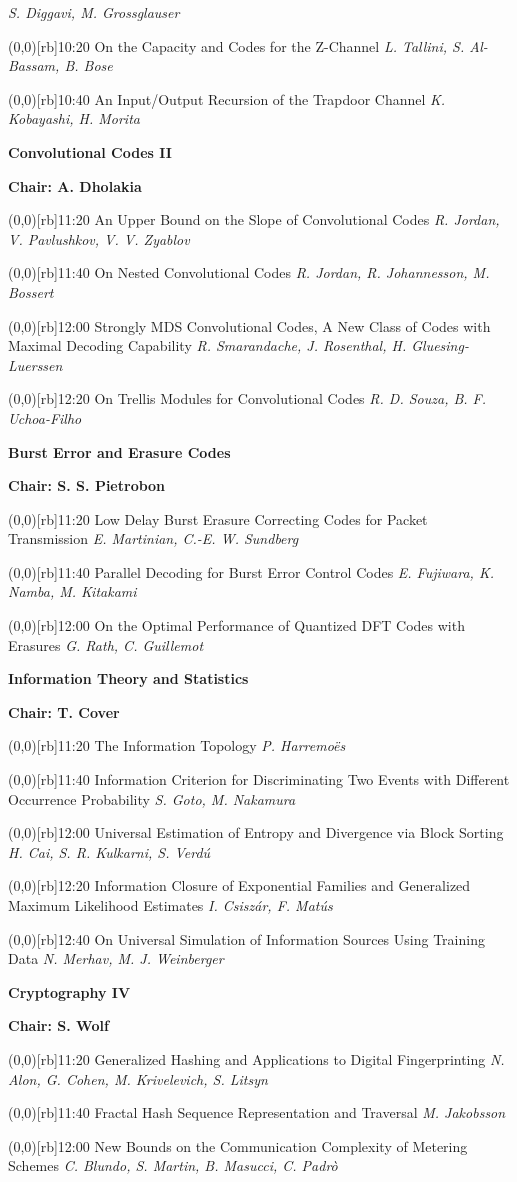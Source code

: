 \documentclass[a5paper,twoside]{article}
\def\period#1{\flushleft{\large\bfseries #1}\markboth{\sf #1}{\sf #1}}
\def\sesstitle#1{\vspace{.45\bigskipamount}\par{\bfseries #1}\par}
\def\sesschair#1{{\bfseries Chair: #1}\par\vspace{.65\medskipamount}}
\def\papertime#1{\makebox(0,0)[rb]{{\scriptsize #1}\hspace{.5em}}}
\def\papertitle#1{#1\hfil\break}
\def\paperauthors#1{{\itshape #1}\par\filbreak\vspace{.65\medskipamount}}
\begin{document}
\paperauthors{S. Diggavi, M. Grossglauser}
\papertime{10:20}%
\papertitle{On the Capacity and Codes for the Z-Channel}
\paperauthors{L. Tallini, S. Al-Bassam, B. Bose}
\papertime{10:40}%
\papertitle{An Input/Output Recursion of the Trapdoor Channel}
\paperauthors{K. Kobayashi, H. Morita}
\period{Fri 11:20 -- 13:00}
\sesstitle{Convolutional Codes II}
\sesschair{A. Dholakia}
\papertime{11:20}%
\papertitle{An Upper Bound on the Slope of Convolutional Codes}
\paperauthors{R. Jordan, V. Pavlushkov, V. V. Zyablov}
\papertime{11:40}%
\papertitle{On Nested Convolutional Codes}
\paperauthors{R. Jordan, R. Johannesson, M. Bossert}
\papertime{12:00}%
\papertitle{Strongly MDS Convolutional Codes, A New Class of Codes with Maximal Decoding Capability}
\paperauthors{R. Smarandache, J. Rosenthal, H. Gluesing-Luerssen}
\papertime{12:20}%
\papertitle{On Trellis Modules for Convolutional Codes}
\paperauthors{R. D. Souza, B. F. Uchoa-Filho}
\sesstitle{Burst Error and Erasure Codes}
\sesschair{S. S. Pietrobon}
\papertime{11:20}%
\papertitle{Low Delay Burst Erasure Correcting Codes for Packet Transmission}
\paperauthors{E. Martinian, C.-E. W. Sundberg}
\papertime{11:40}%
\papertitle{Parallel Decoding for Burst Error Control Codes}
\paperauthors{E. Fujiwara, K. Namba, M. Kitakami}
\papertime{12:00}%
\papertitle{On the Optimal Performance of Quantized DFT Codes with Erasures}
\paperauthors{G. Rath, C. Guillemot}
\sesstitle{Information Theory and Statistics}
\sesschair{T. Cover}
\papertime{11:20}%
\papertitle{The Information Topology}
\paperauthors{P. Harremo\"es}
\papertime{11:40}%
\papertitle{Information Criterion for Discriminating Two Events with Different Occurrence Probability}
\paperauthors{S. Goto, M. Nakamura}
\papertime{12:00}%
\papertitle{Universal Estimation of Entropy and Divergence via Block Sorting}
\paperauthors{H. Cai, S. R. Kulkarni, S. Verd\'u}
\papertime{12:20}%
\papertitle{Information Closure of Exponential Families and Generalized Maximum Likelihood Estimates}
\paperauthors{I. Csisz\'ar, F. Mat\'us}
\papertime{12:40}%
\papertitle{On Universal Simulation of Information Sources Using Training Data}
\paperauthors{N. Merhav, M. J. Weinberger}
\sesstitle{Cryptography IV}
\sesschair{S. Wolf}
\papertime{11:20}%
\papertitle{Generalized Hashing and Applications to Digital Fingerprinting}
\paperauthors{N. Alon, G. Cohen, M. Krivelevich, S. Litsyn}
\papertime{11:40}%
\papertitle{Fractal Hash Sequence Representation and Traversal}
\paperauthors{M. Jakobsson}
\papertime{12:00}%
\papertitle{New Bounds on the Communication Complexity of Metering Schemes}
\paperauthors{C. Blundo, S. Martin, B. Masucci, C. Padr\`o}
\end{document}
